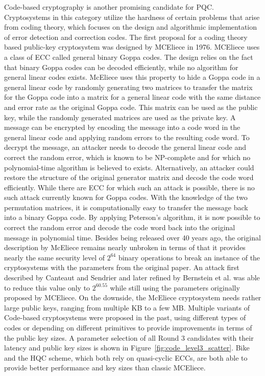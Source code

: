 Code-based cryptography is another promising candidate for \ac{PQC}. Cryptosystems in this category utilize the hardness of certain problems that arise from coding theory, which focuses on the design and algorithmic implementation of error detection and correction codes. The first proposal for a coding theory based public-key cryptosystem was designed by MCEliece in 1976. MCEliece uses a class of \ac{ECC} called general binary Goppa codes. The design relies on the fact that binary Goppa codes can be decoded efficiently, while no algorithm for general linear codes exists. McEliece uses this property to hide a Goppa code in a general linear code by randomly generating two matrices to transfer the matrix for the Goppa code into a matrix for a general linear code with the same distance and error rate as the original Goppa code. This matrix can be used as the public key, while the randomly generated matrices are used as the private key. A message can be encrypted by encoding the message into a code word in the general linear code and applying random errors to the resulting code word. To decrypt the message, an attacker needs to decode the general linear code and correct the random error, which is known to be NP-complete and for which no polynomial-time algorithm is believed to exists\cite{berlekamp1978inherent}. Alternatively, an attacker could restore the structure of the original generator matrix and decode the code word efficiently. While there are \ac{ECC} for which such an attack is possible, there is no such attack currently known for Goppa codes. With the knowledge of the two permutation matrices, it is computationally easy to transfer the message back into a binary Goppa code. By applying Peterson's algorithm, it is now possible to correct the random error and decode the code word back into the original message in polynomial time\cite{mceliece1978public}. Besides being released over 40 years ago, the original description by McEliece remains nearly unbroken in terms of that it provides nearly the same security level of \(2^{64}\) binary operations to break an instance of the cryptosystems with the parameters from the original paper. An attack first described by Canteaut and Sendrier\cite{canteaut1998cryptanalysis} and later refined by Bernstein et al.\cite{bernstein2008attacking} was able to reduce this value only to \(2^{60.55}\) while still using the parameters originally proposed by MCEliece. On the downside, the McEliece cryptosystem needs rather large public keys, ranging from multiple KB to a few MB. Multiple variants of Code-based cryptosystems were proposed in the past, using different types of codes or depending on different primitives to provide improvements in terms of the public key sizes. A parameter selection of all Round 3 candidates with their latency and public key sizes is shown in Figure~\ref{fig:code_level3_scatter}. Bike and the HQC scheme, which both rely on quasi-cyclic \acp{ECC}, are both able to provide better performance and key sizes than classic MCEliece.


